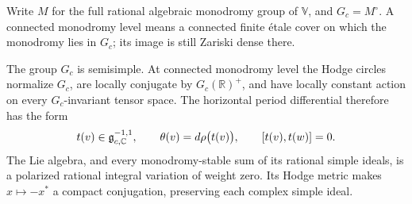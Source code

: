 Write $M$ for the full rational algebraic monodromy group of
$\mathbb V$, and $G_c=M^\circ$.  A connected monodromy level means a
connected finite étale cover on which the monodromy lies in $G_c$;
its image is still Zariski dense there.

\begin{lemma}\label{lem:marked-monodromy}
The group $G_c$ is semisimple.  At connected monodromy level the Hodge
circles normalize $G_c$, are locally conjugate by $G_c(\mathbb R)^+$,
and have locally constant action on every $G_c$-invariant tensor
space.  The horizontal period differential therefore has the form
\begin{equation}\label{eq:marked-period-tangent}
 t(v)\in\mathfrak g_{c,\mathbb C}^{-1,1},
 \qquad \theta(v)=d\rho\bigl(t(v)\bigr),
 \qquad [t(v),t(w)]=0.
\end{equation}
The Lie algebra, and every monodromy-stable sum of its rational
simple ideals, is a polarized rational integral variation of weight
zero.  Its Hodge metric makes $x\mapsto-x^*$ a compact conjugation,
preserving each complex simple ideal.
\end{lemma}

